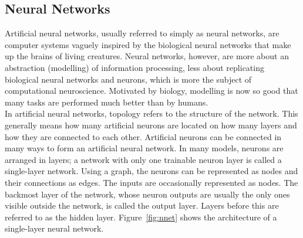 \subsection{Neural Networks}
Artificial neural networks, usually referred to simply as neural networks, are computer systems vaguely inspired by the biological neural networks that make up the brains of living creatures. Neural networks, however, are more about an abstraction (modelling) of information processing, less about replicating biological neural networks and neurons, which is more the subject of computational neuroscience. Motivated by biology, modelling is now so good that many tasks are performed much better than by humans. \\
In artificial neural networks, topology refers to the structure of the network. This generally means how many artificial neurons are located on how many layers and how they are connected to each other. Artificial neurons can be connected in many ways to form an artificial neural network. In many models, neurons are arranged in layers; a network with only one trainable neuron layer is called a single-layer network. 
Using a graph, the neurons can be represented as nodes and their connections as edges. The inputs are occasionally represented as nodes. 
The backmost layer of the network, whose neuron outputs are usually the only ones visible outside the network, is called the output layer. Layers before this are referred to as the hidden layer. Figure~\ref{fig:nnet} shows the architecture of a single-layer neural network. \clearpage
